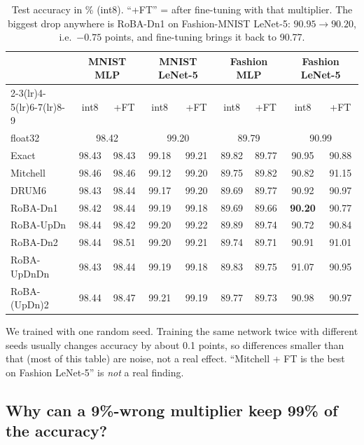 \begin{table}[H]
\centering
\small
\begin{tabular}{lcccccccc}
\toprule
 & \multicolumn{2}{c}{MNIST MLP} & \multicolumn{2}{c}{MNIST LeNet-5} & \multicolumn{2}{c}{Fashion MLP} &
   \multicolumn{2}{c}{Fashion LeNet-5}\\
\cmidrule(lr){2-3}\cmidrule(lr){4-5}\cmidrule(lr){6-7}\cmidrule(lr){8-9}
 & int8 & +FT & int8 & +FT & int8 & +FT & int8 & +FT\\
\midrule
float32 & \multicolumn{2}{c}{98.42} & \multicolumn{2}{c}{99.20} & \multicolumn{2}{c}{89.79} & \multicolumn{2}{c}{90.99}\\
\midrule
Exact & 98.43 & 98.43 & 99.18 & 99.21 & 89.82 & 89.77 & 90.95 & 90.88\\
Mitchell & 98.46 & 98.46 & 99.12 & 99.20 & 89.75 & 89.82 & 90.82 & 91.15\\
DRUM6 & 98.43 & 98.44 & 99.17 & 99.20 & 89.69 & 89.77 & 90.92 & 90.97\\
RoBA-Dn1 & 98.42 & 98.44 & 99.19 & 99.18 & 89.69 & 89.66 & \textbf{90.20} & 90.77\\
RoBA-UpDn & 98.44 & 98.42 & 99.20 & 99.22 & 89.89 & 89.74 & 90.72 & 90.84\\
RoBA-Dn2 & 98.44 & 98.51 & 99.20 & 99.21 & 89.74 & 89.71 & 90.91 & 91.01\\
RoBA-UpDnDn & 98.43 & 98.44 & 99.19 & 99.18 & 89.83 & 89.75 & 91.07 & 90.95\\
RoBA-(UpDn)2 & 98.44 & 98.47 & 99.21 & 99.19 & 89.77 & 89.73 & 90.98 & 90.97\\
\bottomrule
\end{tabular}
\caption{Test accuracy in \% (int8). ``+FT'' = after fine-tuning with that multiplier. The biggest
drop anywhere is RoBA-Dn1 on Fashion-MNIST LeNet-5: $90.95\to90.20$, i.e.\ $-0.75$ points, and
fine-tuning brings it back to 90.77.}
\label{tab:gpuacc}
\end{table}

\begin{careful}
We trained with one random seed. Training the same network twice with different seeds usually changes
accuracy by about 0.1 points, so differences smaller than that (most of this table) are noise, not a real
effect. ``Mitchell + FT is the best on Fashion LeNet-5'' is \emph{not} a real finding.
\end{careful}

\subsection{Why can a 9\%-wrong multiplier keep 99\% of the accuracy?}\label{sec:whyok}

